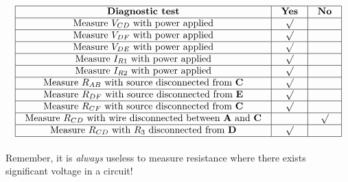 \vfil 

\eject







$$\vbox{\offinterlineskip
\halign{\strut
\vrule \quad\hfil # \ \hfil & 
\vrule \quad\hfil # \ \hfil & 
\vrule \quad\hfil # \ \hfil \vrule \cr
\noalign{\hrule}
%
{\bf Diagnostic test} & {\bf Yes} & {\bf No} \cr
%
\noalign{\hrule}
%
Measure $V_{CD}$ with power applied & $\surd$ &  \cr
%
\noalign{\hrule}
%
Measure $V_{DF}$ with power applied & $\surd$ &  \cr
%
\noalign{\hrule}
%
Measure $V_{DE}$ with power applied & $\surd$ &  \cr
%
\noalign{\hrule}
%
Measure $I_{R1}$ with power applied & $\surd$ &  \cr
%
\noalign{\hrule}
%
Measure $I_{R2}$ with power applied & $\surd$ &  \cr
%
\noalign{\hrule}
%
Measure $R_{AB}$ with source disconnected from {\bf C} & $\surd$ &  \cr
%
\noalign{\hrule}
%
Measure $R_{DF}$ with source disconnected from {\bf E} & $\surd$ &  \cr
%
\noalign{\hrule}
%
Measure $R_{CF}$ with source disconnected from {\bf C} & $\surd$ &  \cr
%
\noalign{\hrule}
%
Measure $R_{CD}$ with wire disconnected between {\bf A} and {\bf C} &  & $\surd$ \cr
%
\noalign{\hrule}
%
Measure $R_{CD}$ with $R_3$ disconnected from {\bf D} & $\surd$ &  \cr
%
\noalign{\hrule}
} %
}$$ %

Remember, it is {\it always} useless to measure resistance where there exists significant voltage in a circuit!











